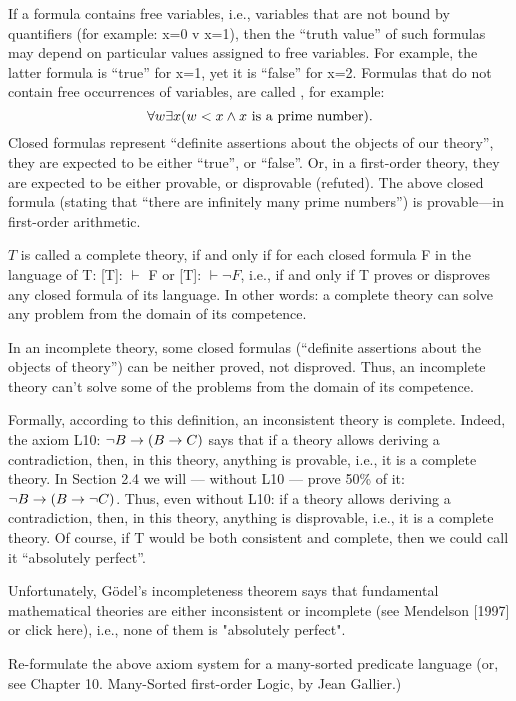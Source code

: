 If a formula contains free variables, i.e., variables that are not bound by quantifiers (for example: x=0 v x=1), then the ``truth value'' of such formulas may depend on particular values assigned to free variables.  For example, the latter formula is ``true'' for x=1, yet it is ``false'' for x=2. Formulas that do not contain free occurrences of variables, are called , for example:
\[
\forall w\exists x( w<x \wedge  x\text{ is a prime number}).
\]
Closed formulas represent ``definite assertions about the objects of our theory'', they are expected to be either ``true'', or ``false''. Or, in a first-order theory, they are expected to be either provable, or disprovable (refuted). The above closed formula (stating that ``there are infinitely many prime numbers'') is provable---in first-order arithmetic.

\(T\) is called a complete theory, if and only if for each closed formula F in the language of T: [T]: \(\vdash\) F or [T]: \(\vdash \neg F\), i.e., if and only if T proves or disproves any closed formula of its language. In other words: a complete theory can solve any problem from the domain of its competence.

In an incomplete theory, some closed formulas (``definite assertions about the objects of theory'') can be neither proved, not disproved. Thus, an incomplete theory can't solve some of the problems from the domain of its competence.

Formally, according to this definition, an inconsistent theory is complete. Indeed, the axiom L10: \(\neg B\rightarrow (B\rightarrow C)\) says that if a theory allows deriving a contradiction, then, in this theory, anything is provable, i.e., it is a complete theory. In Section 2.4 we will --- without L10 --- prove 50\% of it: \(\neg B\rightarrow (B\rightarrow \neg C)\). Thus, even without L10: if a theory allows deriving a contradiction, then, in this theory, anything is disprovable, i.e., it is a complete theory.  Of course, if T would be both consistent and complete, then we could call it ``absolutely perfect''.

Unfortunately, G\"{o}del's incompleteness theorem says that fundamental mathematical theories are
either inconsistent or incomplete (see Mendelson [1997] or click here), i.e., none of them is "absolutely
perfect".

\begin{exercise}
Re-formulate the above axiom system for a many-sorted predicate language (or, see Chapter 10. Many-Sorted first-order Logic, by Jean Gallier.)
\end{exercise}

